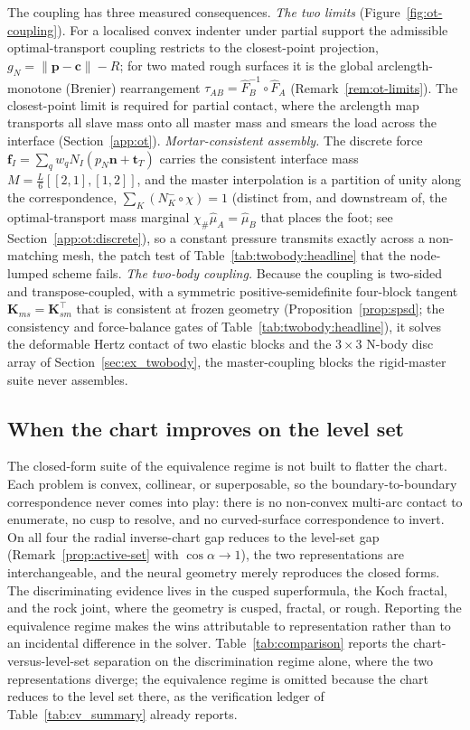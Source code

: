 \documentclass{svjour3}                 %
\newcommand{\norm}[1]{\lVert#1\rVert}
\newcommand{\nbf}{\bm{n}}
\newcommand{\tbf}{\bm{t}}
\newcommand{\fbf}{\bm{f}}
\newcommand{\gn}{g_{\scriptscriptstyle N}}
\newcommand{\tmap}{\tau_{AB}}
\begin{document}
The coupling has three measured consequences. \emph{The two limits} (Figure~\ref{fig:ot-coupling}). For a
localised convex indenter under
partial support the admissible optimal-transport coupling restricts to the closest-point projection,
$\gn=\norm{\bm p-\bm c}-R$; for two mated rough surfaces it is the global arclength-monotone (Brenier)
rearrangement $\tmap=\hat F_B^{-1}\circ\hat F_A$ \citep{brenier1991polar,mccann1995existence}
(Remark~\ref{rem:ot-limits}). The closest-point limit is required for partial contact, where the arclength map
transports all slave mass onto all master mass and smears the load across the interface (Section~\ref{app:ot}). \emph{Mortar-consistent assembly.} The discrete force
$\fbf_I=\sum_q w_q N_I(p_N\nbf+\tbf_T)$ carries the consistent interface mass $M=\tfrac{L}{6}[[2,1],[1,2]]$, and
the master interpolation is a partition of unity along the correspondence, $\sum_K(N_K^-\!\circ\chi)=1$ (distinct
from, and downstream of, the optimal-transport mass marginal $\chi_\#\hat\mu_A=\hat\mu_B$ that places the foot;
see Section~\ref{app:ot:discrete}), so a constant pressure transmits exactly across a non-matching mesh,
the patch test of Table~\ref{tab:twobody:headline} that the node-lumped scheme fails. \emph{The two-body
coupling.} Because the coupling is two-sided and transpose-coupled, with a symmetric positive-semidefinite
four-block tangent $\bm K_{ms}=\bm K_{sm}^{\top}$ that is consistent at frozen geometry (Proposition~\ref{prop:spsd};
the consistency and force-balance gates of Table~\ref{tab:twobody:headline}), it solves the deformable Hertz contact of two elastic blocks and the
$3\times3$ N-body disc array of Section~\ref{sec:ex_twobody}, the master-coupling blocks the rigid-master suite
never assembles.

\subsection{When the chart improves on the level set}\label{sec:disc:regime}

The closed-form suite of the equivalence regime is not built to flatter the chart. Each problem is convex, collinear,
or superposable, so the boundary-to-boundary correspondence never comes into play: there is no non-convex
multi-arc contact to enumerate, no cusp to resolve, and no curved-surface correspondence to invert. On all
four the radial inverse-chart gap reduces to the level-set gap (Remark~\ref{prop:active-set} with
$\cos\alpha\to1$), the two representations are interchangeable, and the neural geometry merely reproduces the
closed forms. The discriminating evidence lives in the cusped superformula, the Koch fractal, and the rock joint, where the
geometry is cusped, fractal, or rough. Reporting the equivalence regime makes the wins attributable to representation rather than to an
incidental difference in the solver. Table~\ref{tab:comparison} reports the chart-versus-level-set separation on
the discrimination regime alone, where the two representations diverge; the equivalence regime is omitted because
the chart reduces to the level set there, as the verification ledger of Table~\ref{tab:cv_summary} already
reports.
\end{document}
